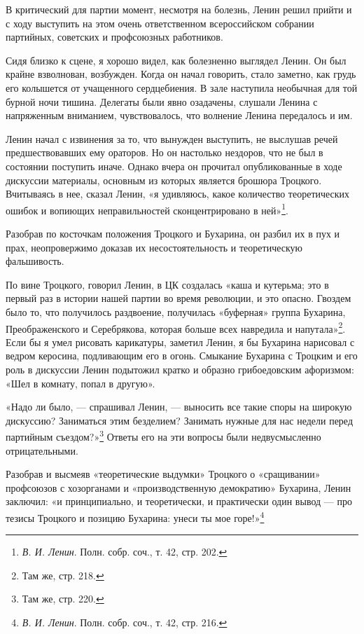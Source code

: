 \documentclass[12pt, a4paper, openany]{book}
\begin{document}
В критический для партии момент, несмотря на болезнь, Ленин решил прийти и с ходу выступить на этом очень ответственном всероссийском собрании партийных, советских и профсоюзных работников.

Сидя близко к сцене, я хорошо видел, как болезненно выглядел Ленин. Он был крайне взволнован, возбужден. Когда он начал говорить, стало заметно, как грудь его колышется от учащенного сердцебиения. В зале наступила необычная для той бурной ночи тишина. Делегаты были явно озадачены, слушали Ленина с напряженным вниманием, чувствовалось, что волнение Ленина передалось и им.

Ленин начал с извинения за то, что вынужден выступить, не выслушав речей предшествовавших ему ораторов. Но он настолько нездоров, что не был в состоянии поступить иначе. Однако вчера он прочитал опубликованные в ходе дискуссии материалы, основным из которых является брошюра Троцкого. Вчитываясь в нее, сказал Ленин, «я удивляюсь, какое количество теоретических ошибок и вопиющих неправильностей сконцентрировано в ней»\footnote{\textit{В. И. Ленин}. Полн. собр. соч., т. 42, стр. 202.}.

Разобрав по косточкам положения Троцкого и Бухарина, он разбил их в пух и прах, неопровержимо доказав их несостоятельность и теоретическую фальшивость.

По вине Троцкого, говорил Ленин, в ЦК создалась «каша и кутерьма; это в первый раз в истории нашей партии во время революции, и это опасно. Гвоздем было то, что получилось раздвоение, получилась «буферная» группа Бухарина, Преображенского и Серебрякова, которая больше всех навредила и напутала»\footnote{Там же, стр. 218.}. Если бы я умел рисовать карикатуры, заметил Ленин, я бы Бухарина нарисовал с ведром керосина, подливающим его в огонь. Смыкание Бухарина с Троцким и его роль в дискуссии Ленин подытожил кратко и образно грибоедовским афоризмом: «Шел в комнату, попал в другую».

«Надо ли было, — спрашивал Ленин, — выносить все такие споры на широкую дискуссию? Заниматься этим безделием? Занимать нужные для нас недели перед партийным съездом?»\footnote{Там же, стр. 220.} Ответы его на эти вопросы были недвусмысленно отрицательными.

Разобрав и высмеяв «теоретические выдумки» Троцкого о «сращивании» профсоюзов с хозорганами и «производственную демократию» Бухарина, Ленин заключил: «и принципиально, и теоретически, и практически один вывод — про тезисы Троцкого и позицию Бухарина: унеси ты мое горе!»\footnote{\textit{В. И. Ленин}. Полн. собр. соч., т. 42, стр. 216.}
\end{document}
